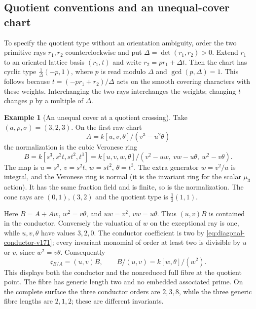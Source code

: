 \documentclass[11pt,reqno]{amsart}
\numberwithin{equation}{section}
\theoremstyle{definition}\newtheorem{definition}[theorem]{Definition}
\newtheorem{example}[theorem]{Example}
\theoremstyle{remark}\newtheorem{remark}[theorem]{Remark}
\begin{document}
\subsection{Quotient conventions and an unequal-cover chart}
To specify the quotient type without an orientation ambiguity, order
the two primitive rays $r_1,r_2$ counterclockwise and put
$\Delta=\det(r_1,r_2)>0$. Extend $r_1$ to an oriented lattice basis
$(r_1,t)$ and write $r_2=pr_1+\Delta t$. Then the chart has cyclic
type $\frac1\Delta(-p,1)$, where $p$ is read modulo $\Delta$ and
$\gcd(p,\Delta)=1$. This follows because
$t=(-p r_1+r_2)/\Delta$ acts on the smooth covering characters with
these weights. Interchanging the two rays interchanges the weights;
changing $t$ changes $p$ by a multiple of $\Delta$.

\begin{example}[An unequal cover at a quotient crossing]
\label{ex:unequal-cover-v171}
Take $(a,\rho,\sigma)=(3,2,3)$. On the first raw chart
\[
 A=k[u,v,\theta]/(v^3-u^2\theta)
\]
the normalization is the cubic Veronese ring
\[
 B=k[s^3,s^2t,st^2,t^3]
   =k[u,v,w,\theta]/(v^2-uw,\ vw-u\theta,\ w^2-v\theta).
\]
The map is $u=s^3$, $v=s^2t$, $w=st^2$, $\theta=t^3$.
The extra generator $w=v^2/u$ is integral, and the Veronese ring is
normal (it is the invariant ring for the scalar $\mu_3$ action).
It has the same fraction field and is finite, so is the normalization.
The cone rays are $(0,1),(3,2)$ and the quotient type is
$\frac13(1,1)$.

Here $B=A+Aw$, $w^2=v\theta$, and $uw=v^2$, $vw=u\theta$.
Thus $(u,v)B$ is contained in the conductor. Conversely the valuation
of $w$ on the exceptional ray is one, while $u,v,\theta$ have
values $3,2,0$. The conductor coefficient is two by
\eqref{eq:diagonal-conductor-v171}; every invariant monomial of
order at least two is divisible by $u$ or $v$, since $w^2=v\theta$.
Consequently
\[
 \mathfrak c_{B/A}=(u,v)B,\qquad
 B/(u,v)=k[w,\theta]/(w^2).
\]
This displays both the conductor and the nonreduced full fibre at the
quotient point. The fibre has generic length two and no embedded
associated prime. On the complete surface the three conductor orders
are $2,3,8$, while the three generic fibre lengths are $2,1,2$;
these are different invariants.
\end{example}
\end{document}
